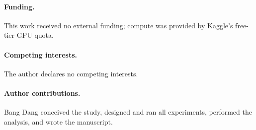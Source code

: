 \documentclass[fleqn,10pt]{wlpeerj}
\begin{document}
\paragraph{Funding.} %
This work received no external funding; compute was provided by Kaggle's free-tier GPU quota.

\paragraph{Competing interests.} %
The author declares no competing interests.

\paragraph{Author contributions.} %
Bang Dang conceived the study, designed and ran all experiments, performed the analysis, and wrote the manuscript.


\end{document}
